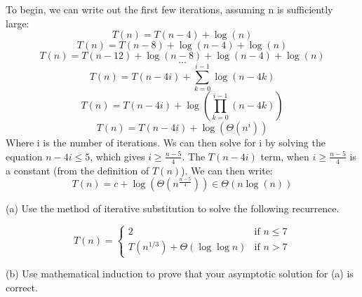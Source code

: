 \documentclass{article}
\begin{document}
\begin{solution}
To begin, we can write out the first few iterations, assuming n is sufficiently large:
$$T(n) = T(n-4) + \log (n)$$
$$T(n) = T(n-8) + \log (n-4) + \log (n)$$
$$T(n) = T(n-12) + \log (n-8) + \log (n-4) + \log (n)$$
$$\textbf{...}$$
$$T(n) = T(n-4i) + \sum_{k = 0}^{i-1} \log (n-4k)$$
$$T(n) = T(n-4i) + \log(\prod_{k=0}^{i-1}(n-4k))$$
$$T(n) = T(n-4i) + \log(\Theta(n^i))$$
Where i is the number of iterations.  Ws can then solve for i by solving the equation $n-4i \leq 5$, which gives $i \geq \frac{n-5}{4}$.  The $T(n-4i)$ term, when $i \geq \frac{n-5}{4}$ is a constant (from the definition of $T(n)$). We can then write:
$$T(n) = c + \log(\Theta(n^{\frac{n-5}{4}})) \in \Theta(n\log(n))$$
\end{solution}

\vskip 0.25in

\begin{problem} %
\begin{description}
\item{(a)} Use the method of iterative substitution to solve the following recurrence. 


$$T(n) =  \begin{cases}
2                 & \text {if $n\leq 7$} \\
 T(n^{1/3}) + \Theta(\log\log n)   & \text{if $n > 7$}
\end{cases}$$

\item{(b)} Use mathematical induction to prove that your asymptotic solution for (a) is correct. 
\end{description}
\end{problem}
\end{document}
